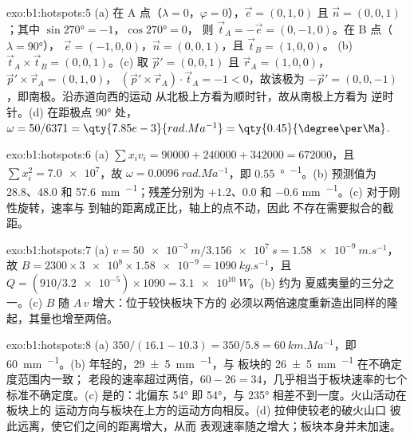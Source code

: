 \begin{solution}{exo:b1:hotspots:5}
(a) 在 A 点（$\lambda = 0$，$\varphi = 0$），$\vec e = (0, 1, 0)$ 且
$\vec n = (0, 0, 1)$；其中 $\sin\ang{270} = -1$，$\cos\ang{270} = 0$，
则 $\vec t_A = -\vec e = (0, -1, 0)$。在 B 点（$\lambda = \ang{90}$），
$\vec e = (-1, 0, 0)$，$\vec n = (0, 0, 1)$，且 $\vec t_B = (1, 0, 0)$。
(b) $\vec t_A\times\vec t_B = (0, 0, 1)$。(c) 取 $\vec p' = (0, 0, 1)$ 且
$\vec r_A = (1, 0, 0)$，$\vec p'\times\vec r_A = (0, 1, 0)$，
$(\vec p'\times\vec r_A)\cdot\vec t_A = -1 < 0$，故该极为
$-\vec p' = (0, 0, -1)$，即南极。沿赤道向西的运动
从北极上方看为顺时针，故从南极上方看为
逆时针。(d) 在距极点 \ang{90} 处，$\omega = 50/6371 =
\qty{7.85e-3}{rad.Ma^{-1}} = \qty{0.45}{\degree\per\Ma}$.
\end{solution}

\begin{solution}{exo:b1:hotspots:6}
(a) $\sum x_i v_i = 90000 + 240000 + 342000 = \num{672000}$，且
$\sum x_i^2 = \num{7.0e7}$，故 $\omega = \qty{0.0096}{rad.Ma^{-1}}$，即
\qty{0.55}{\degree\per\Ma}。(b) 预测值为 28.8、48.0 和
\qty{57.6}{mm.^{-1}}；残差分别为 $+1.2$、$0.0$ 和 $-0.6$
\unit{mm.^{-1}}。(c) 对于刚性旋转，速率与
到轴的距离成正比，轴上的点不动，因此
不存在需要拟合的截距。
\end{solution}

\begin{solution}{exo:b1:hotspots:7}
(a) $v = \qty{50e-3}{m}/\qty{3.156e7}{s} = \qty{1.58e-9}{m.s^{-1}}$，故
$B = 2300\times\num{3e8}\times\num{1.58e-9} = \qty{1090}{kg.s^{-1}}$，且
$Q = (910/\num{3.2e-5})\times1090 = \qty{3.1e10}{W}$。(b) 约为
夏威夷量的三分之一。(c) $B$ 随 $A\,v$ 增大：位于较快板块下方的
必须以两倍速度重新造出同样的隆起，其量也增至两倍。
\end{solution}

\begin{solution}{exo:b1:hotspots:8}
(a) $350/(16.1 - 10.3) = 350/5.8 = \qty{60}{km.Ma^{-1}}$，即
\qty{60}{mm.^{-1}}。(b) 年轻的，\qty{29 \pm 5}{mm.^{-1}}，与
板块的 \qty{26 \pm 5}{mm.^{-1}} 在不确定度范围内一致；
老段的速率超过两倍，$60 - 26 = 34$，几乎相当于板块速率的七个
标准不确定度。(c) 是的：北偏东 \ang{54} 即
\ang{54}，与 \ang{235} 相差不到一度。火山活动在板块上的
运动方向与板块在上方的运动方向相反。(d) 拉伸使较老的破火山口
彼此远离，使它们之间的距离增大，从而
表观速率随之增大；板块本身并未加速。
\end{solution}

